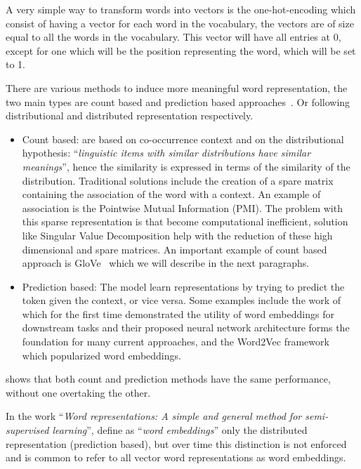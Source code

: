 A very simple way to transform words into vectors is the one-hot-encoding which consist of having a vector for each word in the vocabulary, the vectors are of size equal to all the words in the vocabulary. This vector will have all entries at 0, except for one which will be the position representing the word, which will be set to 1. 

There are various methods to induce more meaningful word representation, the two main types are count based and prediction based approaches~\citep{baroni-etal-2014-dont}. Or following~\cite{turian2010word} distributional and distributed representation respectively.


\begin{itemize}[itemsep = 0.1em]
\item Count based: are based on co-occurrence context and on the distributional hypothesis:  ``\textit{linguistic items with similar distributions have similar meanings}'', hence the similarity is expressed in terms of the similarity of the distribution. Traditional solutions include the creation of a spare matrix containing the association of the word with a context. An example of association is the Pointwise Mutual Information (PMI). The problem with this sparse representation is that become computational inefficient, solution like Singular Value Decomposition help with the reduction of these high dimensional and spare matrices. An important example of count based approach is GloVe~\citep{pennington2014glove} which we will describe in the next paragraphs.

\item Prediction based: 
The model learn representations by trying to predict the token given the context, or vice versa. Some examples include the work of \citet{Collobert2008} which for the first time demonstrated the utility of word embeddings for downstream tasks and their proposed neural network architecture forms the foundation for many current approaches, and the Word2Vec framework ~\citep{mikolov2013models,mikolov2013distributed} which popularized word embeddings.
\end{itemize}

\cite{levy-etal-2015-improving} shows that both count and prediction methods have the same performance, without one overtaking the other.


In the work ``\textit{Word representations: A simple and general method for semi-supervised learning}'', \citet{turian2010word} define as ``\textit{word embeddings}'' only the distributed representation (prediction based), but over time this distinction is not enforced and is common to refer to all vector word representations as word embeddings. 

